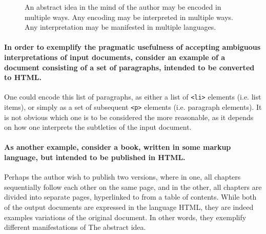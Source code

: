\documentclass{scrreprt}
\begin{document}
\begin{figure}[h]

    \caption{An abstract idea in the mind of the author may be encoded in multiple ways. Any encoding may be interpreted in multiple ways. Any interpretation may be manifested in multiple languages.}
    \label{fig:diagram-explaining-interpretations}
  \end{figure}

\paragraph{In order to exemplify the pragmatic usefulness of accepting ambiguous interpretations of input documents, consider an example of a document consisting of a set of paragraphs, intended to be converted to HTML.} One could encode this list of paragraphs, as either a list of \texttt{<li>} elements (i.e. list items), or simply as a set of subsequent \texttt{<p>} elements (i.e. paragraph elements). It is not obvious which one is to be considered the more reasonable, as it depends on how one interprets the subtleties of the input document.

\paragraph{As another example, consider a book, written in some markup language, but intended to be published in HTML.} Perhaps the author wish to publish two versions, where in one, all chapters sequentially follow each other on the same page, and in the other, all chapters are divided into separate pages, hyperlinked to from a table of contents. While both of the output documents are expressed in the language HTML, they are indeed examples variations of the original document. In other words, they exemplify different manifestations of The abstract idea.
\end{document}
